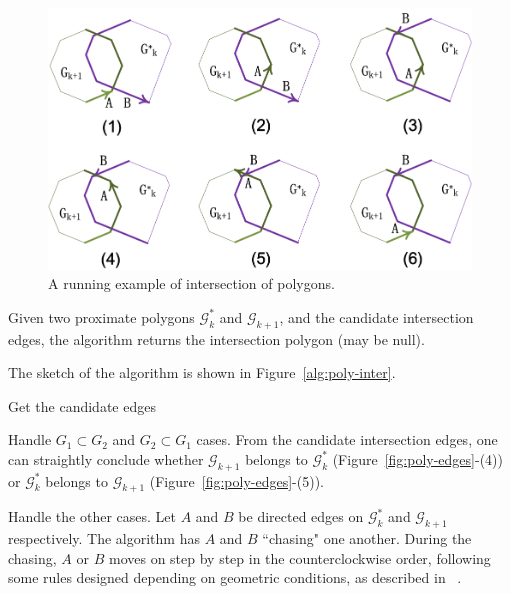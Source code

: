 \begin{figure}[tb!]
\centering
\includegraphics[scale=0.88]{figures/Fig-poly-inter.png}
\vspace{-1ex}
\caption{\small A running example of intersection of polygons.}
\vspace{-2ex}
\label{fig:poly-inter}
\end{figure}


\stitle{\textcolor[rgb]{0.00,0.07,1.00}{polygon intersection algorithm}}
Given two proximate polygons $\mathcal{G}^*_k$ and $\mathcal{G}_{k+1}$, and the candidate intersection edges, the algorithm returns the intersection polygon (may be null).

The sketch of the algorithm is shown in Figure~\ref{alg:poly-inter}.

Get the candidate edges

Handle $G_1 \subset G_2$ and $G_2 \subset G_1$ cases.
From the candidate intersection edges, one can straightly conclude whether $\mathcal{G}_{k+1}$ belongs to $\mathcal{G}^*_{k}$ (Figure~\ref{fig:poly-edges}-(4)) or $\mathcal{G}^*_{k}$ belongs to $\mathcal{G}_{k+1}$ (Figure~\ref{fig:poly-edges}-(5)).

%

Handle the other cases.
Let $A$ and $B$ be directed edges on $\mathcal{G}^*_k$ and $\mathcal{G}_{k+1}$ respectively. The algorithm has $A$ and $B$ ``chasing" one another. During the chasing, $A$ or $B$ moves on step by step in the counterclockwise order, following some rules designed depending on geometric conditions, as described in ~\cite{ORourke:Intersection}.


